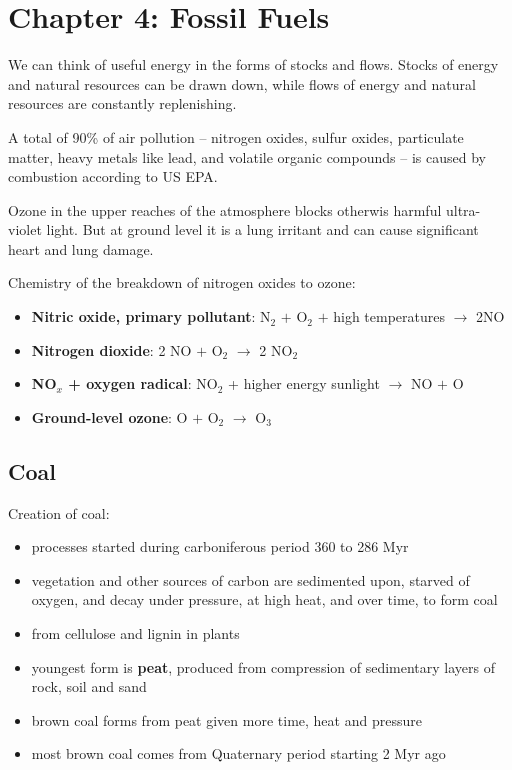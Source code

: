 \section{Chapter 4: Fossil Fuels}

We can think of useful energy in the forms of stocks and flows. Stocks of
energy and natural resources can be drawn down, while flows of energy and
natural resources are constantly replenishing.

A total of 90\% of air pollution -- nitrogen oxides, sulfur oxides, particulate
matter, heavy metals like lead, and volatile organic compounds -- is caused by
combustion according to US EPA.

Ozone in the upper reaches of the atmosphere blocks otherwis harmful
ultra-violet light. But at ground level it is a lung irritant and can cause
significant heart and lung damage.

Chemistry of the breakdown of nitrogen oxides to ozone:
\begin{itemize}
	\item \textbf{Nitric oxide, primary pollutant}:
	N$_2$ $+$ O$_2$ $+$ high temperatures $\rightarrow$ 2NO
	\item \textbf{Nitrogen dioxide}:
	2 NO $+$ O$_2$ $\rightarrow$ 2 NO$_2$
	\item \textbf{NO$_x$ + oxygen radical}:
	NO$_2$ + higher energy sunlight $\rightarrow$ NO $+$ O
	\item \textbf{Ground-level ozone}:
	O $+$ O$_2$ $\rightarrow$ O$_3$
\end{itemize}

\subsection{Coal}

Creation of coal:
\begin{itemize}
	\item processes started during carboniferous period 360 to 286 Myr
	\item vegetation and other sources of carbon are sedimented upon,
	starved of oxygen, and decay under pressure, at high heat, and over
	time, to form coal
	\item from cellulose and lignin in plants
	\item youngest form is \textbf{peat}, produced from compression of
	sedimentary layers of rock, soil and sand
	\item brown coal forms from peat given more time, heat and pressure
	\item most brown coal comes from Quaternary period starting 2 Myr ago
\end{itemize}

